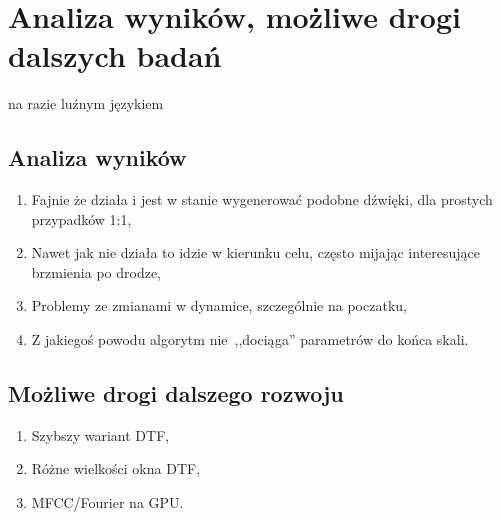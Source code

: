 \chapter{Analiza wyników, możliwe drogi dalszych badań}\label{chap:results_analysis}

\begin{center}
  \large na razie luźnym językiem
\end{center}

\section{Analiza wyników}

\begin{enumerate}
  \item Fajnie że działa i jest w stanie wygenerować podobne dźwięki, dla prostych przypadków 1:1,
  \item Nawet jak nie działa to idzie w kierunku celu, często mijając interesujące brzmienia po drodze,
  \item Problemy ze zmianami w dynamice, szczególnie na poczatku,
  \item Z jakiegoś powodu algorytm nie~,,dociąga'' parametrów do końca skali.
\end{enumerate}

\section{Możliwe drogi dalszego rozwoju}

\begin{enumerate}
  \item Szybszy wariant DTF,
  \item Różne wielkości okna DTF,
  \item MFCC/Fourier na GPU\@.
\end{enumerate}

